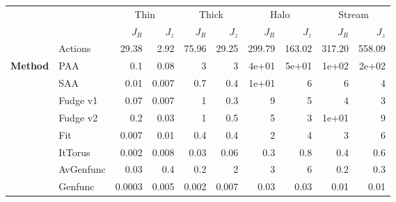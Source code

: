 \begin{tabular}{llrrrrrrrr}
&&\multicolumn{2}{c}{Thin}&\multicolumn{2}{c}{Thick}&\multicolumn{2}{c}{Halo}&\multicolumn{2}{c}{Stream}\\
&&$J_R$&$J_z$&$J_R$&$J_z$&$J_R$&$J_z$&$J_R$&$J_z$\\
\hline
 &Actions & 29.38 & 2.92 & 75.96 & 29.25 & 299.79 &  163.02 & 317.20 &   558.09 \\
\hline
\hline
 \textbf{Method}&PAA      & 0.1   & 0.08  & 3   & 3   & 4e+01 & 5e+01 & 1e+02 & 2e+02 \\
 &SAA      & 0.01  & 0.007 & 0.7 & 0.4 & 1e+01 & 6     & 6     & 4     \\
 &Fudge v1 & 0.07  & 0.007 & 1   & 0.3 & 9     & 5     & 4     & 3     \\
 &Fudge v2 & 0.2   & 0.03  & 1   & 0.5 & 5     & 3     & 1e+01 & 9     \\
 &Fit      & 0.007 & 0.01  & 0.4 & 0.4 & 2     & 4     & 3     & 6     \\
\hline
 &ItTorus   & 0.002  & 0.008 & 0.03  & 0.06  & 0.3  & 0.8  & 0.4  & 0.6  \\
 &AvGenfunc & 0.03   & 0.4   & 0.2   & 2     & 3    & 6    & 0.2  & 0.3  \\
 &Genfunc   & 0.0003 & 0.005 & 0.002 & 0.007 & 0.03 & 0.03 & 0.01 & 0.01 \\
\hline
\end{tabular}
